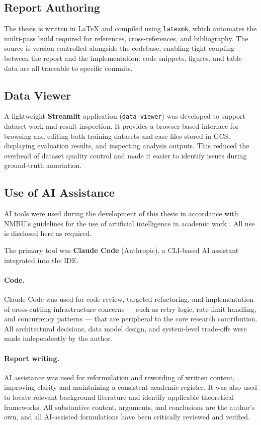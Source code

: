 \subsection{Report Authoring}

The thesis is written in \LaTeX{} and compiled using \texttt{latexmk}, which automates the multi-pass build required for references, cross-references, and bibliography. The source is version-controlled alongside the codebase, enabling tight coupling between the report and the implementation: code snippets, figures, and table data are all traceable to specific commits.

\subsection{Data Viewer}

A lightweight \textbf{Streamlit} application (\texttt{data-viewer}) was developed to support dataset work and result inspection. It provides a browser-based interface for browsing and editing both training datasets and case files stored in GCS, displaying evaluation results, and inspecting analysis outputs. This reduced the overhead of dataset quality control and made it easier to identify issues during ground-truth annotation.

\subsection{Use of AI Assistance}
\label{sec:ai-use}

AI tools were used during the development of this thesis in accordance with NMBU's guidelines for the use of artificial intelligence in academic work \cite{nmbu_ai_guidelines}. All use is disclosed here as required.

The primary tool was \textbf{Claude Code} (Anthropic), a CLI-based AI assistant integrated into the IDE.

\paragraph{Code.}
Claude Code was used for code review, targeted refactoring, and implementation of cross-cutting infrastructure concerns — such as retry logic, rate-limit handling, and concurrency patterns — that are peripheral to the core research contribution. All architectural decisions, data model design, and system-level trade-offs were made independently by the author.

\paragraph{Report writing.}
AI assistance was used for reformulation and rewording of written content, improving clarity and maintaining a consistent academic register. It was also used to locate relevant background literature and identify applicable theoretical frameworks. All substantive content, arguments, and conclusions are the author's own, and all AI-assisted formulations have been critically reviewed and verified.

